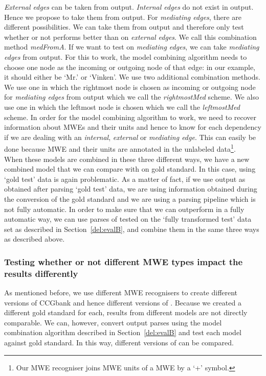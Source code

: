 \documentclass[output=paper]{langsci/langscibook}
\begin{document}
    \indent \textit{External edges} can be taken from output. \textit{Internal edges} do not exist in out\-put. Hence we propose to take them from output. For \textit{mediating edges}, there are different possibilities. We can take them from output and therefore only test whether or not {\modelB} performs better than {\modelA} on \textit{external edges}. We call this combination method \textit{medFromA}. If we want to test {\modelB} on \textit{mediating edges}, we can take \textit{mediating edges} from output. For this to work, the model combining algorithm needs to choose one node as the incoming or outgoing node of that edge: in our example, it should either be `Mr.' or `Vinken'. We use two additional combination methods. We use one in which the rightmost node is chosen as incoming or outgoing node for \textit{mediating edges} from output which we call the \textit{rightmostMed} scheme. We also use one in which the leftmost node is chosen which we call the \textit{leftmostMed} scheme. In order for the model combining algorithm to work, we need to recover information about MWEs and their units and hence to know for each dependency if we are dealing with an \textit{internal}, \textit{external} or \textit{mediating edge}. This can easily be done because MWE and their units are annotated in the unlabeled data\footnote{Our MWE recogniser joins MWE units of a MWE by a `+' symbol.}.\\
    \indent When these models are combined in these three different ways, we have a new combined model that we can compare with {\modelA} on gold standard. In this case, using `gold test' data is again problematic. As a matter of fact, if we use output as obtained after parsing `gold test' data, we are using information obtained during the conversion of the gold standard and we are using a parsing pipeline which is not fully automatic. In order to make sure that we can outperform {\modelA} in a fully automatic way, we can use parses of {\modelB} tested on the `fully transformed test' data set as described in Section~\ref{del:evalB}, and combine them in the same three ways as described above.

    \subsubsection{Testing whether or not different MWE types impact the results differently}
    \label{del:evalB2}
    \indent As mentioned before, we use different MWE recognisers to create different versions of CCGbank and hence different versions of {\modelB}. Because we created a different gold standard for each, results from different models are not directly comparable. We can, however, convert output parses using the model combination algorithm described in Section~\ref{del:evalB} and test each model against gold standard. In this way, different versions of {\modelB} can be compared.
\end{document}
